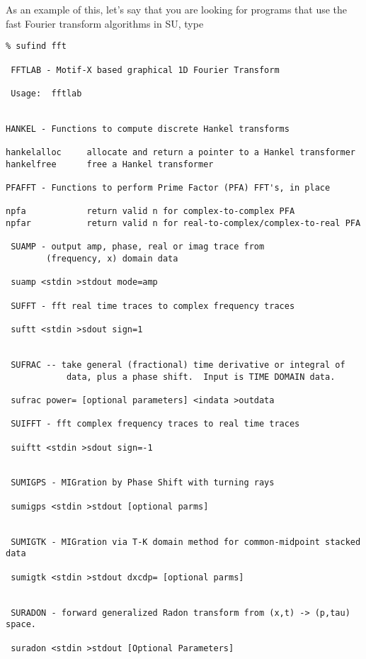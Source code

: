 {{As an example of this,  let's say that you are looking
for programs that use the fast Fourier transform
algorithms in SU, type
{\small\begin{verbatim}
% sufind fft

 FFTLAB - Motif-X based graphical 1D Fourier Transform

 Usage:  fftlab


HANKEL - Functions to compute discrete Hankel transforms

hankelalloc     allocate and return a pointer to a Hankel transformer
hankelfree      free a Hankel transformer

PFAFFT - Functions to perform Prime Factor (PFA) FFT's, in place

npfa            return valid n for complex-to-complex PFA
npfar           return valid n for real-to-complex/complex-to-real PFA

 SUAMP - output amp, phase, real or imag trace from             
        (frequency, x) domain data                              

 suamp <stdin >stdout mode=amp                                  

 SUFFT - fft real time traces to complex frequency traces       

 suftt <stdin >sdout sign=1                                     


 SUFRAC -- take general (fractional) time derivative or integral of     
            data, plus a phase shift.  Input is TIME DOMAIN data.       

 sufrac power= [optional parameters] <indata >outdata                   

 SUIFFT - fft complex frequency traces to real time traces      

 suiftt <stdin >sdout sign=-1                                   


 SUMIGPS - MIGration by Phase Shift with turning rays                   

 sumigps <stdin >stdout [optional parms]                                


 SUMIGTK - MIGration via T-K domain method for common-midpoint stacked data

 sumigtk <stdin >stdout dxcdp= [optional parms]                 


 SURADON - forward generalized Radon transform from (x,t) -> (p,tau) space.

 suradon <stdin >stdout [Optional Parameters]                           



\end{verbatim}}}}

